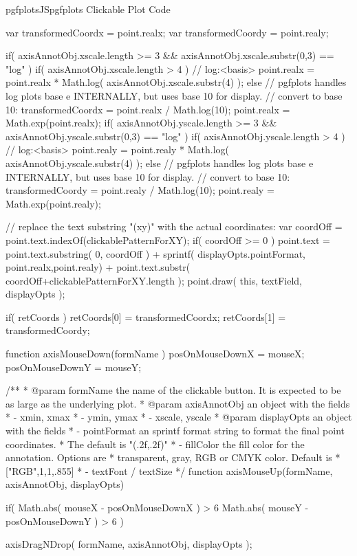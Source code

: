 {{\begin{insDLJS}[processAnnotatedPlot]{pgfplotsJS}{pgfplots Clickable Plot Code}
{	var transformedCoordx = point.realx;
	var transformedCoordy = point.realy;

	if( axisAnnotObj.xscale.length >= 3 && axisAnnotObj.xscale.substr(0,3) == "log" ) {
		if( axisAnnotObj.xscale.length > 4 ) // log:<basis>
			point.realx = point.realx * Math.log( axisAnnotObj.xscale.substr(4) );
		else {
			// pgfplots handles log plots base e INTERNALLY, but uses base 10 for display.
			// convert to base 10:
			transformedCoordx = point.realx / Math.log(10);
		}
		point.realx = Math.exp(point.realx);
	}
	if( axisAnnotObj.yscale.length >= 3 && axisAnnotObj.yscale.substr(0,3) == "log" ) {
		if( axisAnnotObj.yscale.length > 4 ) // log:<basis>
			point.realy = point.realy * Math.log( axisAnnotObj.yscale.substr(4) );
		else {
			// pgfplots handles log plots base e INTERNALLY, but uses base 10 for display.
			// convert to base 10:
			transformedCoordy = point.realy / Math.log(10);
		}
		point.realy = Math.exp(point.realy);
	}

	// replace the text substring "(xy)" with the actual coordinates:
	var coordOff = point.text.indexOf(clickablePatternForXY);
	if( coordOff >= 0 ) {
		point.text = 
			point.text.substring( 0, coordOff ) + 
			sprintf( displayOpts.pointFormat, point.realx,point.realy) +
			point.text.substr( coordOff+clickablePatternForXY.length );
	}
	point.draw( this, textField, displayOpts );

	if( retCoords ) {
		retCoords[0] = transformedCoordx;
		retCoords[1] = transformedCoordy;
	}

}

function axisMouseDown(formName ) 
{
	posOnMouseDownX = mouseX;
	posOnMouseDownY = mouseY;
}

/**
 * @param formName the name of the clickable button. It is expected to be as large as the underlying plot.
 * @param axisAnnotObj an object with the fields
 *   - xmin, xmax
 *   - ymin, ymax
 *   - xscale, yscale
 * @param displayOpts an object with the fields
 *   - pointFormat an sprintf format string to format the final point coordinates.
 *   The default is  "(\pgfplotsPERCENT.2f,\pgfplotsPERCENT.2f)"
 *   - fillColor the fill color for the annotation. Options are
 *    transparent, gray, RGB or CMYK color. Default is
 *       ["RGB",1,1,.855]
 *	 - textFont / textSize
 */
function axisMouseUp(formName, axisAnnotObj, displayOpts)
{
	if( Math.abs( mouseX - posOnMouseDownX ) > 6 \pgfplotsVERTBAR\pgfplotsVERTBAR
		Math.abs( mouseY - posOnMouseDownY ) > 6 )
	{
		axisDragNDrop( formName, axisAnnotObj, displayOpts );

}}
\end{insDLJS}}}
